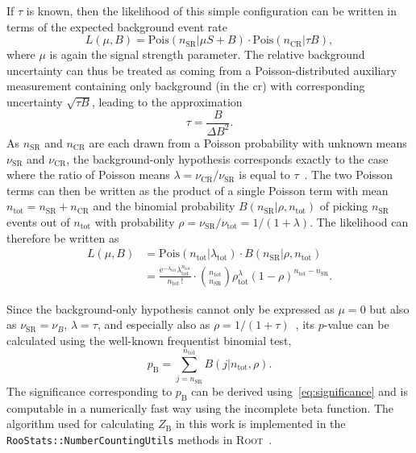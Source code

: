 If $\tau$ is known, then the likelihood of this simple configuration can be written in terms of the expected background event rate
\begin{equation}
	L (\mu,B) = \mathrm{Pois}(n_{\mathrm{SR}}\vert\mu S + B) \cdot \mathrm{Pois}(n_{\mathrm{CR}}\vert\tau B),
\end{equation} 
where $\mu$ is again the signal strength parameter. The relative background uncertainty can thus be treated as coming from a Poisson-distributed auxiliary measurement containing only background (\ie in the \gls{cr}) with corresponding uncertainty $\sqrt{\tau B}$, leading to the approximation
\begin{equation}
	\tau = \frac{B}{\Delta B^2}.
\end{equation}
As $n_{\mathrm{SR}}$ and $n_{\mathrm{CR}}$ are each drawn from a Poisson probability with unknown means $\nu_\mathrm{SR}$ and $\nu_\mathrm{CR}$, the background-only hypothesis corresponds exactly to the case where the ratio of Poisson means \mbox{$\lambda = \nu_\mathrm{CR} / \nu_\mathrm{SR}$} is equal to $\tau$~\cite{Cousins:2007bmb}. The two Poisson terms can then be written as the product of a single Poisson term with mean $n_\mathrm{tot} = n_\mathrm{SR} + n_\mathrm{CR}$ and the binomial probability $B(n_\mathrm{SR}\vert\rho,n_\mathrm{tot})$ of picking $n_\mathrm{SR}$ events out of $n_\mathrm{tot}$ with probability $\rho = \nu_\mathrm{SR} / \nu_\mathrm{tot} = 1 / (1+\lambda)$. The likelihood can therefore be written as
\begin{equation}
\begin{split}
	L(\mu, B) & = \mathrm{Pois} (n_\mathrm{tot}\vert\lambda_\mathrm{tot})\cdot B(n_\mathrm{SR}\vert\rho,n_\mathrm{tot}) \\ 
	& = \frac{\mathrm{e}^{-\lambda_\mathrm{tot}}\lambda_{\mathrm{tot}}^{n_\mathrm{tot}}}{n_\mathrm{tot}\,!} \cdot{n_\mathrm{tot}\choose n_\mathrm{SR}} \rho^\lambda_\mathrm{tot} (1-\rho)^{n_\mathrm{tot}-n_\mathrm{SR}}.
\end{split}
\end{equation}

Since the background-only hypothesis cannot only be expressed as $\mu = 0$ but also as $\nu_\mathrm{SR} = \nu_B$, $\lambda = \tau$, and especially also as $\rho = 1/(1+\tau)$~\cite{Cousins:2007bmb}, its $p$-value can be calculated using the well-known frequentist binomial test,
\begin{equation}
	p_\mathrm{B} = \sum_{j=n_\mathrm{SR}}^{n_\mathrm{tot}} B (j\vert n_\mathrm{tot}, \rho).
\end{equation}
The significance corresponding to $p_\mathrm{B}$ can be derived using~\cref{eq:significance} and is computable in a numerically fast way using the incomplete beta function. The algorithm used for calculating $Z_\mathrm{B}$ in this work is implemented in the \texttt{RooStats::NumberCountingUtils} methods in \textsc{Root}~\cite{ROOT:1997pa,ROOT-2}.



